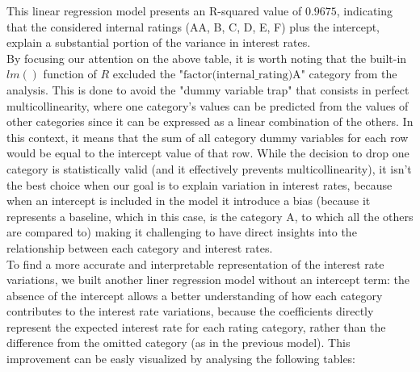 \documentclass[a4paper,12pt]{article}
\begin{document}
This linear regression model presents an R-squared value of $0.9675$, indicating that the considered internal ratings (AA, B, C, D, E, F) plus the intercept, explain a substantial portion of the variance in interest rates.\\
\hfill \break
By focusing our attention on the above table, it is worth noting that the built-in $lm()$ function of $R$ excluded the "$\text{factor(internal\_rating)A}$" category from the analysis. This is done to avoid the "dummy variable trap" that consists in perfect multicollinearity, where one category's values can be predicted from the values of other categories since it can be expressed as a linear combination of the others. In this context, it means that the sum of all category dummy variables for each row would be equal to the intercept value of that row. While the decision to drop one category is statistically valid (and it effectively prevents multicollinearity), it isn't the best choice when our goal is to explain variation in interest rates, because when an intercept is included in the model it introduce a bias (because it represents a baseline, which in this case, is the category A, to which all the others are compared to) making it challenging to have direct insights into the relationship between each category and interest rates.\\
To find a more accurate and interpretable representation of the interest rate variations, we built another liner regression model without an intercept term: the absence of the intercept allows a better understanding of how each category contributes to the interest rate variations, because the coefficients directly represent the expected interest rate for each rating category, rather than the difference from the omitted category (as in the previous model). This improvement can be easly visualized by analysing the following tables:
\end{document}
